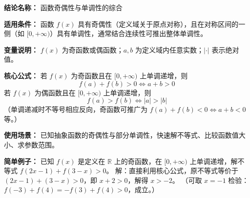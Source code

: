 \textbf{结论名称：} 函数奇偶性与单调性的综合

\textbf{适用条件：} 函数 \( f(x) \) 具有奇偶性（定义域关于原点对称），且在对称区间的一侧（如 \([0,+\infty)\)）具有单调性，通常结合连续性可推出整体单调性。

\textbf{变量说明：} \( f(x) \) 为奇函数或偶函数；\( a,b \) 为定义域内任意实数；\( |\cdot| \) 表示绝对值。

\textbf{核心公式：}
若 \( f(x) \) 为奇函数且在 \([0,+\infty)\) 上单调递增，则
\[ \boxed{ f(a)+f(b)>0 \iff a+b>0 } \]
若 \( f(x) \) 为偶函数且在 \([0,+\infty)\) 上单调递增，则
\[ \boxed{ f(a)>f(b) \iff |a|>|b| } \]
（单调递减时不等号相应反向，奇函数可推广为 \( f(a)+f(b)<0 \iff a+b<0 \) 等。）

\textbf{使用场景：} 已知抽象函数的奇偶性与部分单调性，快速解不等式、比较函数值大小、求参数范围。

\textbf{简单例子：} 已知 \( f(x) \) 是定义在 \( \mathbb{R} \) 上的奇函数，在 \([0,+\infty)\) 上单调递增，解不等式 \( f(2x-1)+f(3-x)>0 \)。
解：直接利用核心公式，原不等式等价于 \( (2x-1)+(3-x)>0 \)，即 \( x+2>0 \)，解得 \( x>-2 \)。
（可取 \( x=-1 \) 检验：\( f(-3)+f(4)=-f(3)+f(4)>0 \)，成立。）